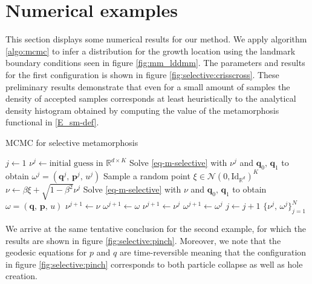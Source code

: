 \documentclass[runningheads]{llncs}
\newcommand{\RdK}{\mathbb{R}^{d\times K}}
\begin{document}
\section{Numerical examples}\label{sec:numerical}

This section displays some numerical results for our method. We apply algorithm
\ref{algo:mcmc} to infer a distribution for the growth location using the
landmark boundary conditions seen in figure \ref{fig:mm_lddmm}.  The parameters
and results for the first configuration is shown in figure
\ref{fig:selective:crisscross}. These preliminary results demonstrate that even
for a small amount of samples the density of accepted samples corresponds at
least heuristically to the analytical density histogram obtained by computing
the value of the metamorphosis functional in \eqref{E_sm-def}.
\begin{algorithm}[h!]
\begin{algorithmic}
\caption{MCMC for selective metamorphosis}\label{algo:mcmc}
\Procedure{mcmcSM}{$N$, $K$, $\mathbf q_0$, $\mathbf q_1$, $\beta\in (0,1]$}
\State $j \gets 1$
\State $\nu^j \gets \text{initial guess in } \RdK$
\State Solve \eqref{eq-m-selective} with $\nu^j$ and $\mathbf q_0,\,\mathbf q_1$
to obtain $\omega^j = (\mathbf q^j,\,\mathbf p^j,\, u^j)$
\State Sample a random point $\xi \in \mathcal N(0, \text{Id}_{\mathbb R^d})^K$
\State $\nu \gets \beta \xi + \sqrt{1-\beta^2} \nu^j$
\State Solve \eqref{eq-m-selective} with $\nu$ and $\mathbf q_0,\,\mathbf q_1$
to obtain $\omega = (\mathbf q,\, \mathbf p,\, u)$
    \State $\nu^{j+1} \gets \nu$
    \State $\omega^{j+1} \gets \omega$
\Else
    \State $\nu^{j+1} \gets \nu^j$
    \State $\omega^{j+1} \gets \omega^j$
\EndIf
\State $j\gets j+1$
\EndWhile
\Return $\{\nu^j,\, \omega^j\}_{j=1}^N$
\EndProcedure
\end{algorithmic}
\end{algorithm}

We arrive at the same tentative conclusion for the second example, for which the
results are shown in figure \eqref{fig:selective:pinch}. Moreover, we note that
the geodesic equations for $p$ and $q$ are time-reversible meaning that the
configuration in figure \ref{fig:selective:pinch} corresponds to both particle
collapse as well as hole creation. 
\end{document}

